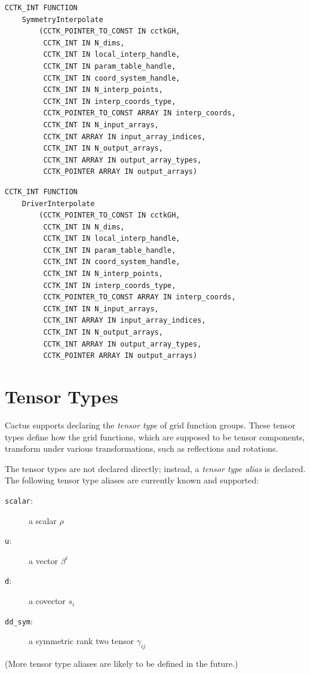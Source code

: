 \begin{verbatim}
CCTK_INT FUNCTION
    SymmetryInterpolate
        (CCTK_POINTER_TO_CONST IN cctkGH,
         CCTK_INT IN N_dims,
         CCTK_INT IN local_interp_handle,
         CCTK_INT IN param_table_handle,
         CCTK_INT IN coord_system_handle,
         CCTK_INT IN N_interp_points,
         CCTK_INT IN interp_coords_type,
         CCTK_POINTER_TO_CONST ARRAY IN interp_coords,
         CCTK_INT IN N_input_arrays,
         CCTK_INT ARRAY IN input_array_indices,
         CCTK_INT IN N_output_arrays,
         CCTK_INT ARRAY IN output_array_types,
         CCTK_POINTER ARRAY IN output_arrays)
\end{verbatim}

\begin{verbatim}
CCTK_INT FUNCTION
    DriverInterpolate
        (CCTK_POINTER_TO_CONST IN cctkGH,
         CCTK_INT IN N_dims,
         CCTK_INT IN local_interp_handle,
         CCTK_INT IN param_table_handle,
         CCTK_INT IN coord_system_handle,
         CCTK_INT IN N_interp_points,
         CCTK_INT IN interp_coords_type,
         CCTK_POINTER_TO_CONST ARRAY IN interp_coords,
         CCTK_INT IN N_input_arrays,
         CCTK_INT ARRAY IN input_array_indices,
         CCTK_INT IN N_output_arrays,
         CCTK_INT ARRAY IN output_array_types,
         CCTK_POINTER ARRAY IN output_arrays)
\end{verbatim}


\section{Tensor Types}

Cactus supports declaring the \emph{tensor type} of grid function
groups.  These tensor types define how the grid functions, which are
supposed to be tensor components, transform under various
transformations, such as reflections and rotations.

The tensor types are not declared directly; instead, a \emph{tensor
type alias} is declared.  The following tensor type aliases are
currently known and supported:
\begin{description}
\item[\texttt{scalar}:] a scalar $\rho$
\item[\texttt{u}:] a vector $\beta^i$
\item[\texttt{d}:] a covector $s_i$
\item[\texttt{dd\_sym}:] a symmetric rank two tensor $\gamma_{ij}$
\end{description}
(More tensor type aliases are likely to be defined in the future.)

